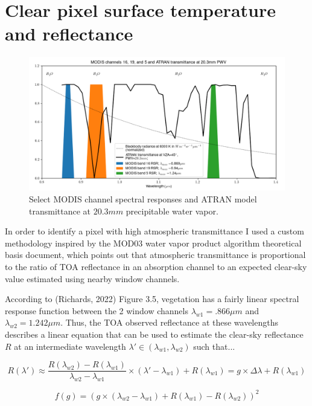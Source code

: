 \documentclass[12pt]{article}
\begin{document}
\clearpage

\section{Clear pixel surface temperature and reflectance}

\begin{figure}[h!]
    \centering
    \includegraphics[width=.9\linewidth]{figures/atran_ref.png}
    \caption{Select MODIS channel spectral responses and ATRAN model transmittance at $20.3mm$ precipitable water vapor.}
    \label{p7_atran}
\end{figure}

In order to identify a pixel with high atmospheric transmittance I used a custom methodology inspired by the MOD03 water vapor product algorithm theoretical basis document, which points out that atmospheric transmittance is proportional to the ratio of TOA reflectance in an absorption channel to an expected clear-sky value estimated using nearby window channels.

According to (Richards, 2022) Figure 3.5, vegetation has a fairly linear spectral response function between the 2 window channels $\lambda_{w1}=.866\mu m$ and $\lambda_{w2}=1.242\mu m$. Thus, the TOA observed reflectance at these wavelengths describes a linear equation that can be used to estimate the clear-sky reflectance $R$ at an intermediate wavelength $\lambda' \in (\lambda_{w1}, \lambda_{w2})$ such that...

\begin{equation}\label{q7_ref_gain}
    R(\lambda') \approx \frac{R(\lambda_{w2})-R(\lambda_{w1})}{\lambda_{w2} - \lambda_{w1}} \times (\lambda'-\lambda_{w1}) + R(\lambda_{w1}) = g \times \Delta\lambda + R(\lambda_{w1})
\end{equation}

\begin{equation}\label{q7_gain_func}
    f(g) = \left( g \times (\lambda_{w2}-\lambda_{w1}) + R(\lambda_{w1})-R(\lambda_{w2}) \right)^2
\end{equation}
\end{document}
